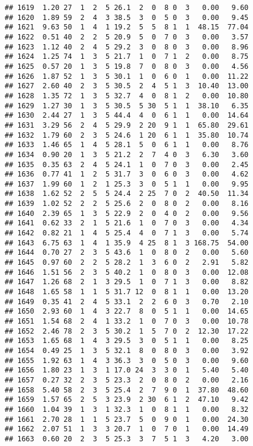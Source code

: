 \documentclass[
]{article}
\begin{document}
\begin{verbatim}
## 1619  1.20 27  1  2  5 26.1  2  0  8 0  3   0.00   9.60
## 1620  1.89 59  2  4  3 38.5  3  0  5 0  3   0.00   9.45
## 1621  9.63 50  1  4  1 19.2  5  5  8 1  1  48.15  77.04
## 1622  0.51 40  2  2  5 20.9  5  0  7 0  3   0.00   3.57
## 1623  1.12 40  2  4  5 29.2  3  0  8 0  3   0.00   8.96
## 1624  1.25 74  1  3  5 21.7  1  0  7 1  2   0.00   8.75
## 1625  0.57 20  1  3  5 19.8  7  0  8 0  3   0.00   4.56
## 1626  1.87 52  1  3  5 30.1  1  0  6 0  1   0.00  11.22
## 1627  2.60 40  2  3  5 30.5  2  4  5 1  3  10.40  13.00
## 1628  1.35 72  1  3  5 32.7  4  0  8 1  2   0.00  10.80
## 1629  1.27 30  1  3  5 30.5  5 30  5 1  1  38.10   6.35
## 1630  2.44 27  1  3  5 44.4  4  0  6 1  1   0.00  14.64
## 1631  3.29 56  2  4  5 29.9  2 20  9 1  1  65.80  29.61
## 1632  1.79 60  2  3  5 24.6  1 20  6 1  1  35.80  10.74
## 1633  1.46 65  1  4  5 28.1  5  0  6 1  1   0.00   8.76
## 1634  0.90 20  1  3  5 21.2  2  7  4 0  3   6.30   3.60
## 1635  0.35 63  2  4  5 24.1  1  0  7 0  3   0.00   2.45
## 1636  0.77 41  1  2  5 31.7  3  0  6 0  3   0.00   4.62
## 1637  1.99 60  1  2  1 25.3  3  0  5 1  1   0.00   9.95
## 1638  1.62 52  2  5  5 24.4  2 25  7 0  2  40.50  11.34
## 1639  1.02 52  2  2  5 25.6  2  0  8 0  2   0.00   8.16
## 1640  2.39 65  1  3  5 22.9  2  0  4 0  2   0.00   9.56
## 1641  0.62 33  2  1  5 21.6  1  0  7 0  3   0.00   4.34
## 1642  0.82 21  1  4  5 25.4  4  0  7 1  3   0.00   5.74
## 1643  6.75 63  1  4  1 35.9  4 25  8 1  3 168.75  54.00
## 1644  0.70 27  2  3  5 43.6  1  0  8 0  2   0.00   5.60
## 1645  0.97 60  2  2  5 28.2  1  3  6 0  2   2.91   5.82
## 1646  1.51 56  2  3  5 40.2  1  0  8 0  3   0.00  12.08
## 1647  1.26 68  2  1  3 29.5  1  0  7 1  3   0.00   8.82
## 1648  1.65 58  1  1  5 31.7 12  0  8 1  1   0.00  13.20
## 1649  0.35 41  2  4  5 33.1  2  2  6 0  3   0.70   2.10
## 1650  2.93 60  1  4  3 22.7  8  0  5 1  1   0.00  14.65
## 1651  1.54 68  2  4  1 33.2  1  0  7 0  3   0.00  10.78
## 1652  2.46 78  2  3  5 30.2  1  5  7 0  2  12.30  17.22
## 1653  1.65 68  1  4  3 29.5  3  0  5 1  1   0.00   8.25
## 1654  0.49 25  1  3  5 32.1  8  0  8 0  3   0.00   3.92
## 1655  1.92 63  1  4  3 36.3  3  0  5 0  3   0.00   9.60
## 1656  1.80 23  1  3  1 17.0 24  3  3 0  1   5.40   5.40
## 1657  0.27 32  2  3  5 23.3  2  0  8 0  2   0.00   2.16
## 1658  5.40 58  2  3  5 25.4  2  7  9 0  1  37.80  48.60
## 1659  1.57 65  2  5  3 23.9  2 30  6 1  2  47.10   9.42
## 1660  1.04 39  1  3  1 32.3  1  0  8 1  1   0.00   8.32
## 1661  2.70 28  1  1  5 23.7  5  0  9 0  1   0.00  24.30
## 1662  2.07 51  1  3  3 20.7  1  0  7 0  1   0.00  14.49
## 1663  0.60 20  2  3  5 25.3  3  7  5 1  3   4.20   3.00

\end{verbatim}
\end{document}
